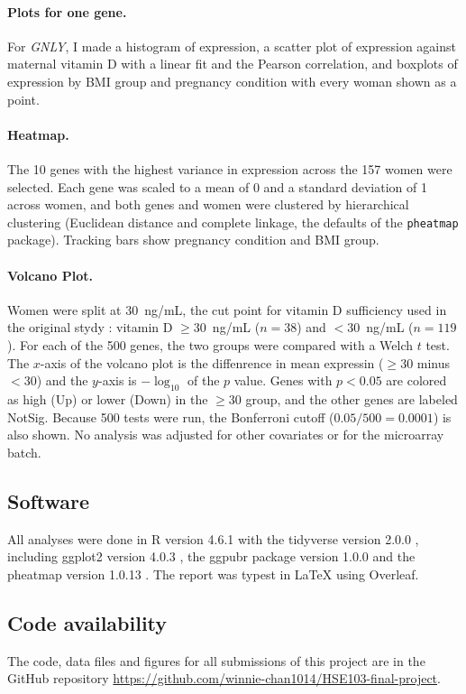 \documentclass{article}
\newcommand{\gene}[1]{\textit{#1}}
\begin{document}
\paragraph{Plots for one gene.} For \gene{GNLY}, I made a histogram of expression, a scatter plot of expression against maternal vitamin D with a linear fit and the Pearson correlation, and boxplots of expression by BMI group and pregnancy condition with every woman shown as a point.

\paragraph{Heatmap.}The 10 genes with the highest variance in expression across the 157 women were selected. Each gene was scaled to a mean of 0 and a standard deviation of 1 across women, and both genes and women were clustered by hierarchical clustering (Euclidean distance and complete linkage, the defaults of the \texttt{pheatmap} package). Tracking bars show pregnancy condition and BMI group.

\paragraph{Volcano Plot.} Women were split at 30~ng/mL, the cut point for vitamin D sufficiency used in the original stydy \citep{Mirzakhani2016}: vitamin D $\geq$30~ng/mL ($n=38$) and $<$30~ng/mL ($n=119$). For each of the 500 genes, the two groups were compared with a Welch $t$ test. The $x$-axis of the volcano plot is the diffenrence in mean expressin ($\geq$30 minus $<$30) and the $y$-axis is $-\log_{10}$ of the $p$ value. Genes with $p < 0.05$ are colored as high (Up) or lower (Down) in the $\geq$30 group, and the other genes are labeled NotSig. Because 500 tests were run, the Bonferroni cutoff ($0.05/500 = 0.0001$) is also shown. No analysis was adjusted for other covariates or for the microarray batch.

\subsection{Software}
All analyses were done in R version 4.6.1 \citep{Rbase} with the tidyverse version 2.0.0 \citep{tidyverse}, including ggplot2 version 4.0.3 \citep{ggplot2}, the ggpubr package version 1.0.0 \citep{ggpubr} and the pheatmap version 1.0.13 \citep{pheatmap}. The report was typest in \LaTeX{} using Overleaf.

\subsection{Code availability}
The code, data files and figures for all submissions of this project are in the GitHub repository \url{https://github.com/winnie-chan1014/HSE103-final-project}.
\end{document}
